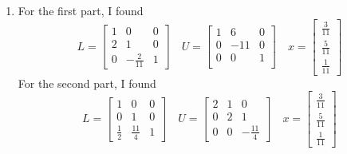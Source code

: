 \documentclass{article}
\begin{document}
\begin{enumerate}
\item For the first part, I found
\begin{equation*}
L = 
\begin{bmatrix}
1 & 0 & 0\\
2 & 1 & 0\\
0 & -\frac{2}{11} & 1	
\end{bmatrix}
\quad
U = 
\begin{bmatrix}
1 & 6 & 0\\
0 & -11 & 0\\
0 & 0 & 1\\	
\end{bmatrix}
\quad
x =
\begin{bmatrix}
\frac{3}{11}\\
\frac{5}{11}\\
\frac{1}{11}
\end{bmatrix}
\end{equation*}
For the second part, I found
\begin{equation*}
L = 
\begin{bmatrix}
1 & 0 & 0\\
0 & 1 & 0\\
\frac{1}{2} & \frac{11}{4} & 1	
\end{bmatrix}
\quad
U = 
\begin{bmatrix}
2 & 1 & 0\\
0 & 2 & 1\\
0 & 0 & -\frac{11}{4}
\end{bmatrix}
\quad
x =
\begin{bmatrix}
\frac{3}{11}\\
\frac{5}{11}\\
\frac{1}{11}
\end{bmatrix}
\end{equation*}


\end{enumerate}
\end{document}
